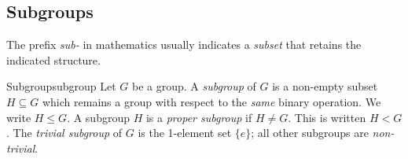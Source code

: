 \begin{exercises}
\begin{enumerate}
	  
	  
	  
	\end{enumerate}
\end{exercises}


\clearpage


\subsection{Subgroups}\label{sec:subgroup}

The prefix \emph{sub-} in mathematics usually indicates a \emph{subset} that retains the indicated structure.

\begin{defn}{Subgroup}{subgroup}
	Let $G$ be a group. A \emph{subgroup} of $G$ is a non-empty subset $H\subseteq G$ which remains a group with respect to the \emph{same} binary operation. We write $H\le G$.\smallbreak
	A subgroup $H$ is a \emph{proper subgroup} if $H\neq G$. This is written $H<G$.\smallbreak
	The \emph{trivial subgroup} of $G$ is the 1-element set $\{e\}$; all other subgroups are \emph{non-trivial}.
\end{defn}


